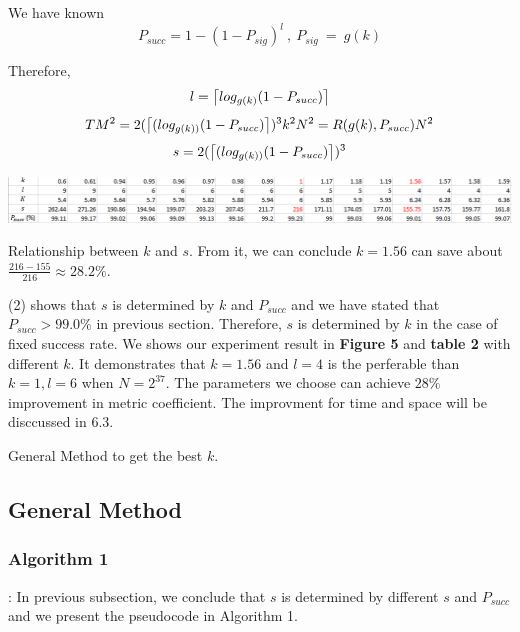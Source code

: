 \documentclass[runningheads,a4paper]{llncs}
\begin{document}
We have known $$P_{succ} = 1- (1 - P_{sig})^l~,~P_{sig}~=~g(k)$$

Therefore, $$l = \ceil[\big]{log_{g(k)} (1-P_{succ})} $$ $$TM^2 = 2(\ceil[\big]{(log_{g(k))} (1-P_{succ})})^3 k^2 N^2 = R(g(k), P_{succ}) N^2$$ 
\begin{equation} 
\label{metric} s = 2(\ceil[\big]{(log_{g(k))} (1-P_{succ})})^3
\end{equation}

\begin{table}
  \includegraphics[width=\linewidth]{table2}
  \caption{Relationship between $k$ and $s$. From it, we can conclude  $k = 1.56$ can save about $\frac{216−155}{216} \approx 28.2\%$.}
\end{table}

(2) shows that $s$ is determined by $k$ and $P_{succ}$ and we have stated that $P_{succ} > 99.0\%$ in previous section. Therefore, $s$ is determined by $k$ in the case of fixed success rate. We shows our experiment result in \textbf{Figure 5} and \textbf{table 2} with different $k$. It demonstrates that $k = 1.56$ and $l = 4$ is the perferable than $k = 1, l = 6$ when $N = 2^{37}$. The parameters we choose can achieve $28\%$ improvement in metric coefficient. The improvment for time and space will be disccussed in 6.3.

\begin{algorithm*}[!ht]
\DontPrintSemicolon
{}
\caption{General Method to get the best $k$.}
\end{algorithm*}

\subsection{General Method}
\subsubsection{Algorithm 1}: In previous subsection, we conclude that $s$ is  determined by different $s$ and $P_{succ}$ and we present the pseudocode in Algorithm 1.
\end{document}

